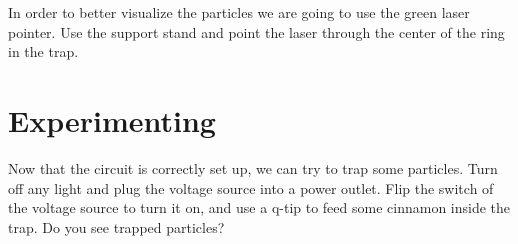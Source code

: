 \documentclass[%
oneside,                 %
final,                   %
10pt]{article}
\begin{document}
In order to better visualize the particles we are going to use the green laser pointer. Use the support stand and point the laser through the center of the ring in the trap.

\section{Experimenting}
\label{title:exp}
Now that the circuit is correctly set up, we can try to trap some particles. Turn off any light and plug the voltage source into a power outlet. Flip the switch of the voltage source to turn it on, and use a q-tip to feed some cinnamon inside the trap. Do you see trapped particles?


\end{document}
